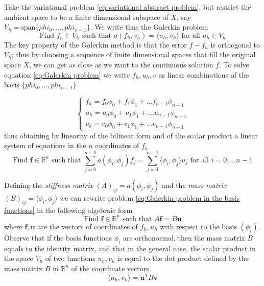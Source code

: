 Take the variational problem \ref{eq:variational abstract problem}, but restrict the ambient space to be a finite dimensional subspace of $X$, say $V_h = \text{span}\{phi_0, ..., phi_{n-1}\}$. We write thus the Galerkin problem
\begin{equation}\label{eq:Galerkin problem}
		\text{Find }f_h\in V_h\text{ such that } a(f_h, v_h)=\langle u_h, v_h\rangle \text{ for all } u_h \in V_h
\end{equation}
The key property of the Galerkin method is that the error $f-f_h$ is orthogonal to $V_h$; thus by choosing a sequence of finite dimensional spaces that fill the original space $X$, we can get as close as we want to the continuous solution $f$.
To solve equation \ref{eq:Galerkin problem} we write $f_h, u_h, v$ as linear combinations of the basis $\{phi_0, ..., phi_{n-1}\}$

$$\begin{cases}
f_h = f_0\phi_0 +  f_1\phi_1 + ...  f_{n-1}\phi_{n-1}\\
u_h = u_0\phi_0 +  u_1\phi_1 + ...  u_{n-1}\phi_{n-1}\\
v_h = v_0\phi_0 +  v_1\phi_1 + ...  v_{n-1}\phi_{n-1}
\end{cases}
$$
 thus obtaining by linearity of the bilinear form and of the scalar product a linear system of equations in the $n$ coordinates of $f_h$
\begin{equation}\label{eq:Galerkin problem in the basis functions}
\text{Find }\mathbf f\in\mathbb R^n\text{ such that } \sum_{j=0}^{n-1}a(\phi_i, \phi_j)f_j=\sum_{j=0}^{n-1}\langle \phi_i, \phi_j\rangle u_j \text{ for all } i=0, ... n-1
\end{equation}

Defining the \textit{stiffness matrix} $(A)_{ij} = a(\phi_i, \phi_j)$ and the \textit{mass matrix} $(B)_{ij} = \langle \phi_i, \phi_j\rangle$ we can rewrite problem \ref{eq:Galerkin problem in the basis functions} in the following algebraic form
\begin{equation}\label{eq:Galerkin algebraic}
\text{Find }\mathbf f\in\mathbb R^n\text{ such that } A\mathbf f = B \mathbf u
\end{equation}
where $\mathbf f, \mathbf u$ are the vectors of coordinates of $f_h, u_h$ with respect to the basis $(\phi_i)$. Observe that if the basis functions $\phi_i$ are orthonormal, then the mass matrix $B$ equals to the identity matrix, and that in the general case, the scalar product in the space $V_h$ of two functions $u_h, v_h$ is equal to the dot product defined by the mass matrix $B$ in $\mathbb R^n$ of the coordinate vectors
\begin{equation}\label{eq:dot product}
	\langle u_h, v_h\rangle = \mathbf u^T B \mathbf v
\end{equation}

